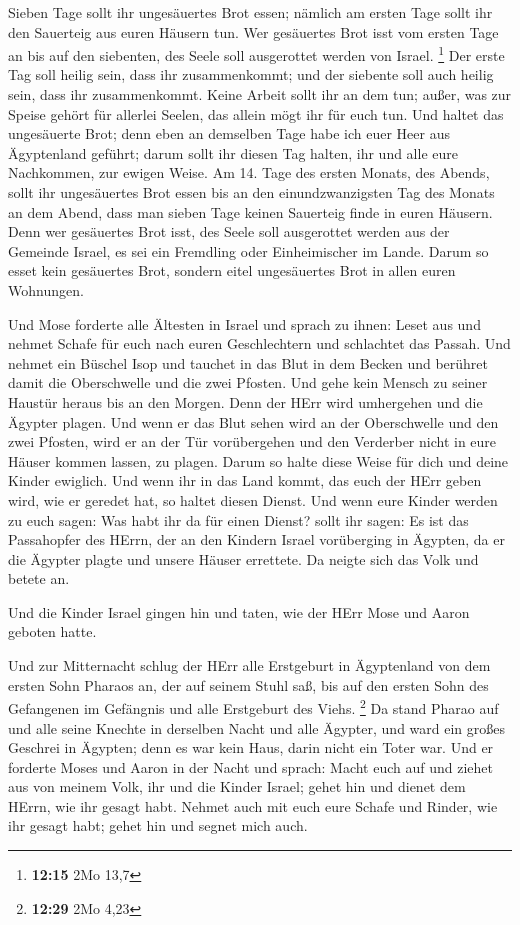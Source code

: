  Sieben Tage sollt ihr ungesäuertes Brot essen; nämlich am
ersten Tage sollt ihr den Sauerteig aus euren Häusern tun. Wer
gesäuertes Brot isst vom ersten Tage an bis auf den siebenten, des Seele
soll ausgerottet werden von Israel. \footnote{\textbf{12:15} 2Mo 13,7}
 Der erste Tag soll heilig sein, dass ihr zusammenkommt;
und der siebente soll auch heilig sein, dass ihr zusammenkommt. Keine
Arbeit sollt ihr an dem tun; außer, was zur Speise gehört für allerlei
Seelen, das allein mögt ihr für euch tun.  Und haltet das
ungesäuerte Brot; denn eben an demselben Tage habe ich euer Heer aus
Ägyptenland geführt; darum sollt ihr diesen Tag halten, ihr und alle
eure Nachkommen, zur ewigen Weise.  Am 14. Tage des ersten
Monats, des Abends, sollt ihr ungesäuertes Brot essen bis an den
einundzwanzigsten Tag des Monats an dem Abend,  dass man
sieben Tage keinen Sauerteig finde in euren Häusern. Denn wer gesäuertes
Brot isst, des Seele soll ausgerottet werden aus der Gemeinde Israel, es
sei ein Fremdling oder Einheimischer im Lande.  Darum so
esset kein gesäuertes Brot, sondern eitel ungesäuertes Brot in allen
euren Wohnungen.

 Und Mose forderte alle Ältesten in Israel und sprach zu
ihnen: Leset aus und nehmet Schafe für euch nach euren Geschlechtern und
schlachtet das Passah.  Und nehmet ein Büschel Isop und
tauchet in das Blut in dem Becken und berühret damit die Oberschwelle
und die zwei Pfosten. Und gehe kein Mensch zu seiner Haustür heraus bis
an den Morgen.  Denn der HErr wird umhergehen und die
Ägypter plagen. Und wenn er das Blut sehen wird an der Oberschwelle und
den zwei Pfosten, wird er an der Tür vorübergehen und den Verderber
nicht in eure Häuser kommen lassen, zu plagen.  Darum so
halte diese Weise für dich und deine Kinder ewiglich.  Und
wenn ihr in das Land kommt, das euch der HErr geben wird, wie er geredet
hat, so haltet diesen Dienst.  Und wenn eure Kinder werden
zu euch sagen: Was habt ihr da für einen Dienst?  sollt ihr
sagen: Es ist das Passahopfer des HErrn, der an den Kindern Israel
vorüberging in Ägypten, da er die Ägypter plagte und unsere Häuser
errettete. Da neigte sich das Volk und betete an.

 Und die Kinder Israel gingen hin und taten, wie der HErr
Mose und Aaron geboten hatte.

 Und zur Mitternacht schlug der HErr alle Erstgeburt in
Ägyptenland von dem ersten Sohn Pharaos an, der auf seinem Stuhl saß,
bis auf den ersten Sohn des Gefangenen im Gefängnis und alle Erstgeburt
des Viehs. \footnote{\textbf{12:29} 2Mo 4,23}  Da stand
Pharao auf und alle seine Knechte in derselben Nacht und alle Ägypter,
und ward ein großes Geschrei in Ägypten; denn es war kein Haus, darin
nicht ein Toter war.  Und er forderte Moses und Aaron in
der Nacht und sprach: Macht euch auf und ziehet aus von meinem Volk, ihr
und die Kinder Israel; gehet hin und dienet dem HErrn, wie ihr gesagt
habt.  Nehmet auch mit euch eure Schafe und Rinder, wie ihr
gesagt habt; gehet hin und segnet mich auch.

